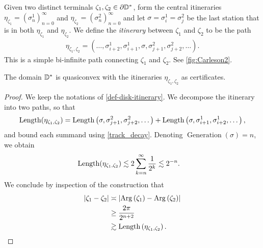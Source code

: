 \begin{definition} \label{def-disk-itinerary} Given two distinct terminals $\zeta_{1},\zeta_{2}\in\partial\mathbb{D}^*$, form the central itineraries $\eta_{\zeta_{1}}=\left(\sigma_{n}^{1}\right)_{n=0}^{\infty}$ and 
	$\eta_{\zeta_{2}}=\left(\sigma_{n}^{2}\right)_{n=0}^{\infty}$
	 and let  $\sigma=\sigma^1_i=\sigma^2_j$ be the last station that is in both $\eta_{\zeta_{1}}$ and $\eta_{\zeta_{2}}$. %
	 We define the \emph{itinerary} between  $\zeta_{1}$ and $\zeta_{2}$ to be the path  %
 \begin{gather*}
 \eta_{\zeta_{1},\zeta_{2}}=  \left(\dots,\sigma_{i+2}^{1},\sigma_{i+1}^{1},\sigma,\sigma_{j+1}^{2},\sigma_{j+2}^{2},\dots\right).
 \end{gather*}
	This is a simple bi-infinite path connecting $\zeta_{1}$ and $\zeta_{2}$. See \cref{fig:Carleson2}. 
\end{definition}


\begin{theorem} \label{quasiconvex disk}
The domain $\mathbb{D}^{*}$ is quasiconvex with the itineraries $\eta_{\zeta_1,\zeta_2}$ as certificates.
\end{theorem}

\begin{proof}
We keep the notations of \cref{def-disk-itinerary}.
We decompose the itinerary into two paths, so that
\begin{equation}
\operatorname{Length}(\eta_{\zeta_{1},\zeta_{2}})=\operatorname{Length}\left(\sigma,\sigma_{j+1}^{2},\sigma_{j+2}^{2},\dots\right)
+\operatorname{Length}\left(\sigma,\sigma_{i+1}^{1},\sigma_{i+2}^{1},\dots\right),
\end{equation}
and bound each summand using \cref{track_decay}. Denoting $\operatorname{Generation}(\sigma)=n$, we obtain
\begin{align*}
\operatorname{Length}(\eta_{\zeta_{1},\zeta_{2}})
&\lesssim 2 \sum_{k=n}^{\infty}\frac{1}{2^{k}} 
\lesssim2^{-n}. \label{eq:1}
\end{align*}
We conclude by inspection of the construction that 
\begin{align*}
\left|\zeta_{1}-\zeta_{2}\right|
&\asymp
\left|\operatorname{Arg}\left(\zeta_{1}\right)-\operatorname{Arg}\left(\zeta_{2}\right)\right|\\
&\geq \frac {2\pi}{2^{n+2}}\\
&\gtrsim 	\operatorname{Length}\left(\eta_{\zeta_{1},\zeta_{2}}\right).
\end{align*}
\end{proof}


